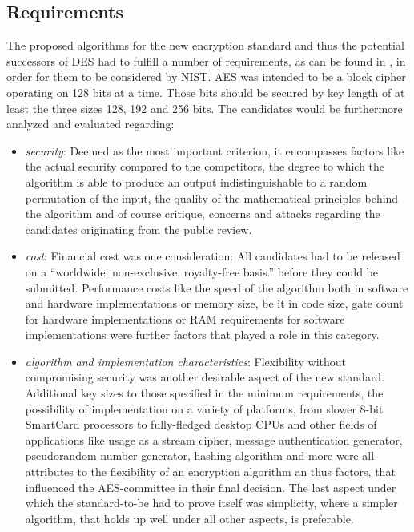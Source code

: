 \subsection{Requirements}
\label{ch:requirements}

The proposed algorithms for the new encryption standard and thus the
potential successors of DES had to fulfill a number of requirements, as can be found in \cite{announcementrequest}, in order for them to be considered by NIST. AES was intended to be a block cipher operating on 128 bits at a time. Those bits should be secured by
key length of at least the three sizes 128, 192 and 256 bits.
The candidates would be furthermore analyzed and evaluated regarding:

\begin{itemize}
\item
  \emph{security}: Deemed as the most important criterion, it
  encompasses factors like the actual security compared to the
  competitors, the degree to which the algorithm is able to produce an
  output indistinguishable to a random permutation of the input, the
  quality of the mathematical principles behind the algorithm and of
  course critique, concerns and attacks regarding the candidates
  originating from the public review.
\item
  \emph{cost}: Financial cost was one consideration: All candidates had
  to be released on a ``worldwide, non-exclusive, royalty-free basis.''
  before they could be submitted. Performance costs like the speed of
  the algorithm both in software and hardware implementations or memory
  size, be it in code size, gate count for hardware implementations or
  RAM requirements for software implementations were further factors
  that played a role in this category.
\item
  \emph{algorithm and implementation characteristics}: Flexibility
  without compromising security was another desirable aspect of the new
  standard. Additional key sizes to those specified in the minimum
  requirements, the possibility of implementation on a variety of
  platforms, from slower 8-bit SmartCard processors to fully-fledged
  desktop CPUs and other fields of applications like usage as a stream
  cipher, message authentication generator, pseudorandom number
  generator, hashing algorithm and more were all attributes to the
  flexibility of an encryption algorithm an thus factors, that
  influenced the AES-committee in their final decision. The last aspect
  under which the standard-to-be had to prove itself was simplicity,
  where a simpler algorithm, that holds up well under all other aspects,
  is preferable.
\end{itemize}


